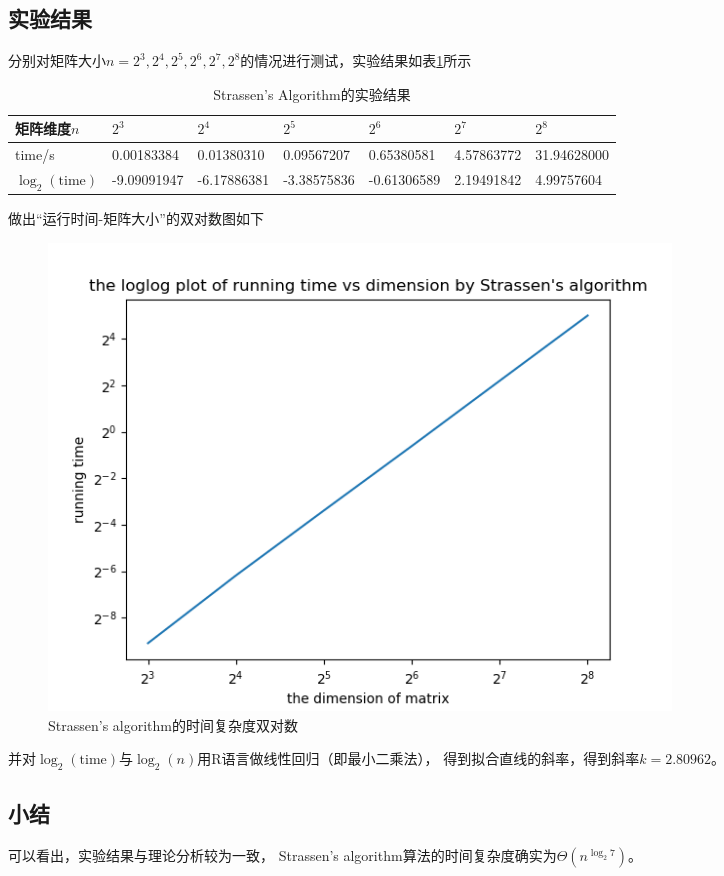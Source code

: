 \documentclass{article}
\begin{document}
\subsection{实验结果}
	分别对矩阵大小$n=2^3,2^4,2^5,2^6,2^7,2^8$的情况进行测试，实验结果如表\ref{st-result}所示
	\begin{table}[H]
	\centering
	\caption{Strassen's Algorithm的实验结果}
	\label{st-result}
	\begin{tabular}{lllllll}
	\hline
	矩阵维度$n$         & $2^3$ & $2^4$ & $2^5$ & $2^6$ & $2^7$ & $2^8$ \\ 
	\hline
	time/s      & 0.00183384           & 0.01380310           & 0.09567207           & 0.65380581           & 4.57863772           & 31.94628000          \\
	$\log_2(\text{time})$ & -9.09091947          & -6.17886381          & -3.38575836          & -0.61306589          & 2.19491842           & 4.99757604           \\ 
	\hline
	\end{tabular}
	\end{table}

\par 做出“运行时间-矩阵大小”的双对数图如下
	\begin{figure}[H]
			\centering  %
			\includegraphics[width=0.8\textwidth]{Strassen}
			\caption{Strassen's algorithm的时间复杂度双对数}
		\end{figure}

\par 并对$\log_2(\text{time})$与$\log_2(n)$用R语言做线性回归（即最小二乘法），
得到拟合直线的斜率，得到斜率$k=2.80962$。


\subsection{小结} 可以看出，实验结果与理论分析较为一致，
Strassen's algorithm算法的时间复杂度确实为$\Theta(n^{\log_2 7})$。
\end{document}
